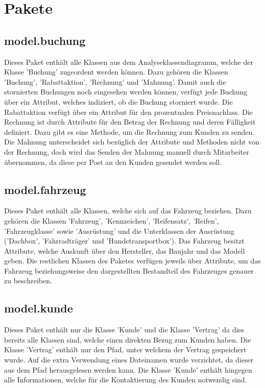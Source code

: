 \newpage

\section{Pakete}

\subsection{model.buchung}

Dieses Paket enthält alle Klassen aus dem Analyseklassendiagramm, welche der Klasse 'Buchung' zugeordent werden können. Dazu gehören die Klassen 'Buchung', 'Rabattaktion', 'Rechnung' und 'Mahnung'. Damit auch die stornierten Buchungen noch eingesehen werden können, verfügt jede Buchung über ein Attribut, welches indiziert, ob die Buchung storniert wurde. Die Rabattaktion verfügt über ein Attribut für den prozentualen Preisnachlass. Die Rechnung ist durch Attribute für den Betrag der Rechnung und deren Fälligkeit definiert. Dazu gibt es eine Methode, um die Rechnung zum Kunden zu senden. Die Mahnung unterscheidet sich bezüglich der Attribute und Methoden nicht von der Rechnung, doch wird das Senden der Mahnung manuell durch Mitarbeiter übernommen, da diese per Post an den Kunden gesendet werden soll. 

\subsection{model.fahrzeug}

Dieses Paket enthält alle Klassen, welche sich auf das Fahrzeug beziehen. Dazu gehören die Klassen 'Fahrzeug', 'Kennzeichen', 'Reifensatz', 'Reifen', 'Fahrzeugklasse' sowie 'Ausrüstung' und die Unterklassen der Ausrüstung ('Dachbox', 'Fahrradträger' und 'Hundetransportbox').
Das Fahrzeug besitzt Attribute, welche Auskunft über den Hersteller, das Baujahr und das Modell geben. Die restlichen Klassen des Paketes verfügen jeweils über Attribute, um das Fahrzeug beziehungsweise den dargestellten Bestandteil des Fahrzeuges genauer zu beschreiben. 

\subsection{model.kunde}

Dieses Paket enthält nur die Klasse 'Kunde' und die Klasse 'Vertrag' da dies bereits alle Klassen sind, welche einen direkten Bezug zum Kunden haben.
Die Klasse 'Vertrag' enthält nur den Pfad, unter welchem der Vertrag gespeichert wurde. Auf die extra Verwendung eines Dateinamen wurde verzichtet, da dieser aus dem Pfad herausgelesen werden kann. Die Klasse 'Kunde' enthält hingegen alle Informationen, welche für die Kontaktierung des Kunden notwendig sind.

